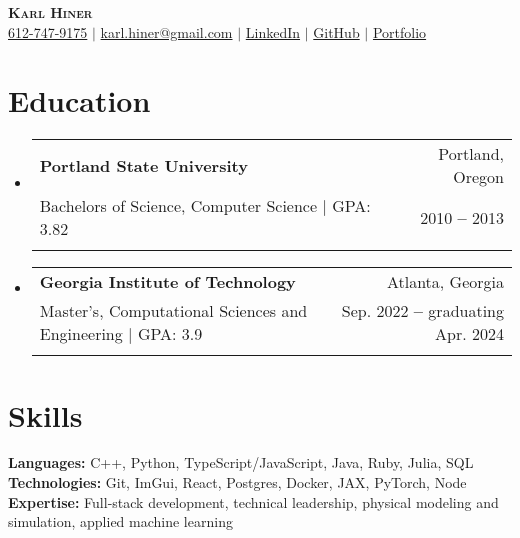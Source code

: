 \documentclass[letterpaper,11pt]{article}
\makeatletter
\newcommand{\resumeEducationHeading}[6]{
  \vspace{-2pt}\item
    \begin{tabular*}{0.97\textwidth}[t]{l@{\extracolsep{\fill}}r}
      \textbf{#1} & \small #2 \\
      \small#3 & \small #4 \\
      \small#5 & \small #6 \\
    \end{tabular*}\vspace{-1.75em}
}
\newcommand{\resumeSubHeadingListStart}{\begin{itemize}[leftmargin=0.15in, label={}]}
\newcommand{\resumeSubHeadingListEnd}{\end{itemize}}
\makeatother
\begin{document}

\begin{center}
    \textbf{\Huge \scshape Karl Hiner} \\ \vspace{3pt}
    \small
    \faMobile \hspace{.5pt} \href{tel:6127479175}{612-747-9175}
    $|$
    \faAt \hspace{.5pt} \href{mailto:karl.hiner@gmail.com}{karl.hiner@gmail.com}
    $|$
    \faLinkedinSquare \hspace{.5pt} \href{https://www.linkedin.com/in/karl-hiner-9534b333}{LinkedIn}
    $|$
    \faGithub \hspace{.5pt} \href{https://github.com/khiner}{GitHub}
    $|$
    \faGlobe \hspace{.5pt} \href{https://karlhiner.com}{Portfolio}
\end{center}


\section{Education}
  \vspace{3pt}
  \resumeSubHeadingListStart
    \resumeEducationHeading
      {Portland State University}{Portland, Oregon}
      {Bachelors of Science, Computer Science $|$ \footnotesize{GPA: 3.82}}{2010 \textbf{--} 2013}{}{}
    \resumeEducationHeading
      {Georgia Institute of Technology}{Atlanta, Georgia}
      {Master's, Computational Sciences and Engineering $|$ \footnotesize{GPA: 3.9}}{Sep. 2022 \textbf{--} graduating Apr. 2024}{}{}
  \resumeSubHeadingListEnd

\section{Skills}
  \vspace{2pt}
  \resumeSubHeadingListStart
    \small{\item{
        \textbf{Languages:}{ C++, Python, TypeScript/JavaScript, Java, Ruby, Julia, SQL} \\ \vspace{3pt}
        \textbf{Technologies:}{ Git, ImGui, React, Postgres, Docker, JAX, PyTorch, Node} \\ \vspace{3pt}
        \textbf{Expertise:}{ Full-stack development, technical leadership, physical modeling and simulation, applied machine learning} \\ \vspace{3pt}
    }}
  \resumeSubHeadingListEnd
\end{document}
